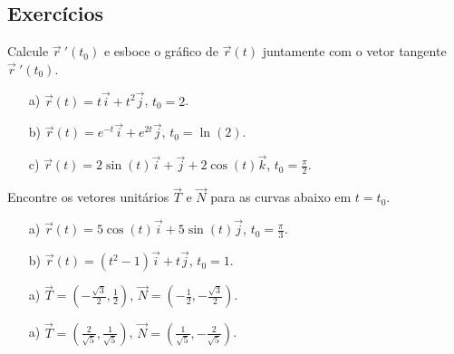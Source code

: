 \subsection*{Exercícios} %
\begin{exer}Calcule $\vec{r}\!~'(t_0)$ e esboce o gráfico de $\vec{r}(t)$ juntamente com o vetor tangente $\vec{r}\!~'(t_0)$.
\begin{itemize}
 \item[a)] $\vec{r}(t)=t\vec{i}+t^2\vec{j}$, $t_0=2$.
 \item[b)] $\vec{r}(t)=e^{-t}\vec{i}+e^{2t}\vec{j}$, $t_0=\ln(2)$.
 \item[c)] $\vec{r}(t)=2\sin(t)\vec{i}+\vec{j}+2\cos(t)\vec{k}$, $t_0=\frac{\pi}{2}$.
 \end{itemize}
\end{exer}
\begin{exer}
Encontre os vetores unitários $\vec{T}$ e $\vec{N}$ para as curvas abaixo em $t=t_0$.
\begin{itemize}
 \item[a)] $\vec{r}(t)=5\cos(t)\vec{i}+5\sin(t)\vec{j}$, $t_0=\frac{\pi}{3}$.
 \item[b)] $\vec{r}(t)=(t^2-1)\vec{i}+t\vec{j}$, $t_0=1$.
\end{itemize}
\end{exer}
\begin{resp}
 \begin{itemize}
  \item[a)]$\vec{T}=\left(-\frac{\sqrt{3}}{2},\frac{1}{2}\right)$, $\vec{N}=\left(-\frac{1}{2},-\frac{\sqrt{3}}{2}\right)$.
  \item[a)]$\vec{T}=\left(\frac{2}{\sqrt{5}},\frac{1}{\sqrt{5}}\right)$, $\vec{N}=\left(\frac{1}{\sqrt{5}},-\frac{2}{\sqrt{5}}\right)$.
 \end{itemize}

\end{resp}

